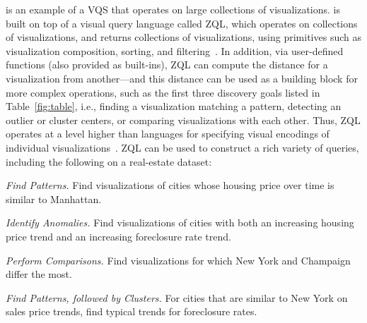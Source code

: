 \zv is an example of a VQS that operates on 
large collections of visualizations.
\zv is built on top of a visual query language
called ZQL, which operates on collections of visualizations, and returns
collections of visualizations,
using primitives such as visualization composition,
sorting, and filtering~\cite{Siddiqui2016}. 
In addition, via user-defined functions (also provided as built-ins),
ZQL can compute the distance for a visualization from another---and this
distance can be used as a building block for more complex
operations, such as the first three discovery goals listed
in Table~\ref{fig:table}, i.e., finding a visualization
matching a pattern, detecting an outlier or cluster centers,
or comparing visualizations with each other.
Thus, ZQL operates at a level higher than
languages for specifying visual encodings of
individual visualizations~\cite{Stolte2002,Wilkinson2005}.
ZQL can be used to construct a rich variety of queries,
including the following on a real-estate dataset:
\squishlist
	\item {\em Find Patterns.} Find visualizations of cities whose housing price over time is similar to Manhattan. 
	\item {\em Identify Anomalies.} Find visualizations of cities with both an increasing housing price trend and an increasing foreclosure rate trend.
	\item {\em Perform Comparisons.} Find visualizations for which New York and Champaign differ the most.
	\item {\em Find Patterns, followed by Clusters.} For cities that are similar
	to New York on sales price trends, find typical trends for foreclosure rates.
\squishend

